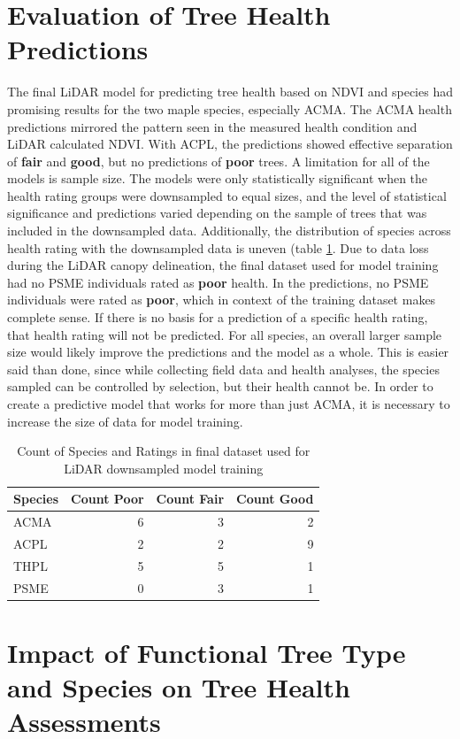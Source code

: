 \documentclass[12pt,twoside]{reedthesis}
\begin{document}
\hypertarget{evaluation-of-tree-health-predictions}{%
\section{Evaluation of Tree Health Predictions}\label{evaluation-of-tree-health-predictions}}

The final LiDAR model for predicting tree health based on NDVI and
species had promising results for the two maple species, especially
ACMA. The ACMA health predictions mirrored the pattern seen in the
measured health condition and LiDAR calculated NDVI. With ACPL, the
predictions showed effective separation of \textbf{fair} and \textbf{good}, but no
predictions of \textbf{poor} trees. A limitation for all of the models is
sample size. The models were only statistically significant when the
health rating groups were downsampled to equal sizes, and the level of
statistical significance and predictions varied depending on the sample
of trees that was included in the downsampled data. Additionally, the
distribution of species across health rating with the downsampled data
is uneven (table \ref{tab:species-counts-bleh}. Due to data loss during
the LiDAR canopy delineation, the final dataset used for model training
had no PSME individuals rated as \textbf{poor} health. In the predictions, no
PSME individuals were rated as \textbf{poor}, which in context of the
training dataset makes complete sense. If there is no basis for a
prediction of a specific health rating, that health rating will not be
predicted. For all species, an overall larger sample size would likely
improve the predictions and the model as a whole. This is easier said
than done, since while collecting field data and health analyses, the
species sampled can be controlled by selection, but their health cannot
be. In order to create a predictive model that works for more than just
ACMA, it is necessary to increase the size of data for model training.
\begin{table}

\caption{\label{tab:species-counts-bleh}Count of Species and Ratings in final dataset used for LiDAR downsampled model training}
\centering
\begin{tabular}[t]{lrrr}
\toprule
Species & Count Poor & Count Fair & Count Good\\
\midrule
ACMA & 6 & 3 & 2\\
ACPL & 2 & 2 & 9\\
THPL & 5 & 5 & 1\\
PSME & 0 & 3 & 1\\
\bottomrule
\end{tabular}
\end{table}
\hypertarget{impact-of-functional-tree-type-and-species-on-tree-health-assessments}{%
\section{Impact of Functional Tree Type and Species on Tree Health Assessments}\label{impact-of-functional-tree-type-and-species-on-tree-health-assessments}}
\end{document}
